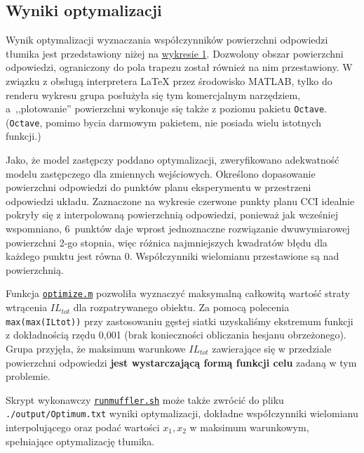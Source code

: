 \documentclass{sprawozdanie-agh}
\begin{document}
\subsection{Wyniki optymalizacji}
\par Wynik optymalizacji wyznaczania współczynników powierzchni odpowiedzi tłumika jest przedstawiony niżej na \hyperref[plane]{wykresie 1}. {\color{teal}Dozwolony obszar powierzchni odpowiedzi}, ograniczony do pola trapezu został również na nim przestawiony. W związku z obsługą interpretera \LaTeX{} przez środowisko MATLAB, tylko do renderu wykresu grupa posłużyła się tym komercjalnym narzędziem, a~,,plotowanie'' powierzchni wykonuje się także z poziomu pakietu \texttt{Octave}. (\texttt{Octave}, pomimo bycia darmowym pakietem, nie posiada wielu istotnych funkcji.)
\par Jako, że model zastępczy poddano optymalizacji, zweryfikowano adekwatność modelu zastępczego dla zmiennych wejściowych. Określono dopasowanie powierzchni odpowiedzi do punktów planu eksperymentu w przestrzeni odpowiedzi układu. {\color{purple}Zaznaczone na wykresie czerwone punkty planu CCI} idealnie pokryły się z interpolowaną powierzchnią odpowiedzi, ponieważ jak wcześniej wspomniano, 6~punktów daje wprost jednoznaczne rozwiązanie dwuwymiarowej powierzchni 2-go stopnia, więc różnica najmniejszych kwadratów błędu dla każdego punktu jest równa 0. Współczynniki wielomianu przestawione są nad powierzchnią.
\par Funkcja \hyperref[list6]{\texttt{optimize.m}} pozwoliła wyznaczyć maksymalną całkowitą wartość straty wtrącenia $IL_{tot}$ dla rozpatrywanego obiektu. Za pomocą polecenia \texttt{max(max(ILtot))} przy zastosowaniu gęstej siatki uzyskaliśmy ekstremum funkcji z dokładnością rzędu 0,001 (brak konieczności obliczania hesjanu obrzeżonego). Grupa przyjęła, że maksimum warunkowe $IL_{tot}$ zawierające się w przedziale powierzchni odpowiedzi \textbf{jest wystarczającą formą funkcji celu} zadaną w tym problemie.
\par Skrypt wykonawczy \hyperref[list1]{\texttt{runmuffler.sh}} może także zwrócić do pliku \texttt{./output/Optimum.txt} wyniki optymalizacji, dokładne współczynniki wielomianu interpolującego oraz podać wartości $x_1, x_2$ w maksimum warunkowym, spełniające optymalizację tłumika.
\setcounter{figure}{0}
\end{document}
